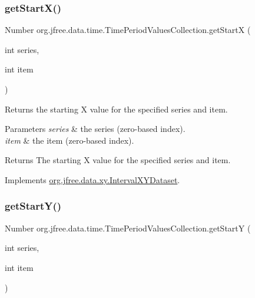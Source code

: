 \subsubsection{\texorpdfstring{get\+Start\+X()}{getStartX()}}
{\footnotesize\ttfamily Number org.\+jfree.\+data.\+time.\+Time\+Period\+Values\+Collection.\+get\+StartX (\begin{DoxyParamCaption}\item[{int}]{series,  }\item[{int}]{item }\end{DoxyParamCaption})}

Returns the starting X value for the specified series and item.


\begin{DoxyParams}{Parameters}
{\em series} & the series (zero-\/based index). \\
\hline
{\em item} & the item (zero-\/based index).\\
\hline
\end{DoxyParams}
\begin{DoxyReturn}{Returns}
The starting X value for the specified series and item. 
\end{DoxyReturn}


Implements \mbox{\hyperlink{interfaceorg_1_1jfree_1_1data_1_1xy_1_1_interval_x_y_dataset_a7548ec7d60d72463313dc6f10aceee62}{org.\+jfree.\+data.\+xy.\+Interval\+X\+Y\+Dataset}}.

\mbox{\label{classorg_1_1jfree_1_1data_1_1time_1_1_time_period_values_collection_ad2e6b7fc456ccf6b7492c720f722198e}} 
\subsubsection{\texorpdfstring{get\+Start\+Y()}{getStartY()}}
{\footnotesize\ttfamily Number org.\+jfree.\+data.\+time.\+Time\+Period\+Values\+Collection.\+get\+StartY (\begin{DoxyParamCaption}\item[{int}]{series,  }\item[{int}]{item }\end{DoxyParamCaption})}

